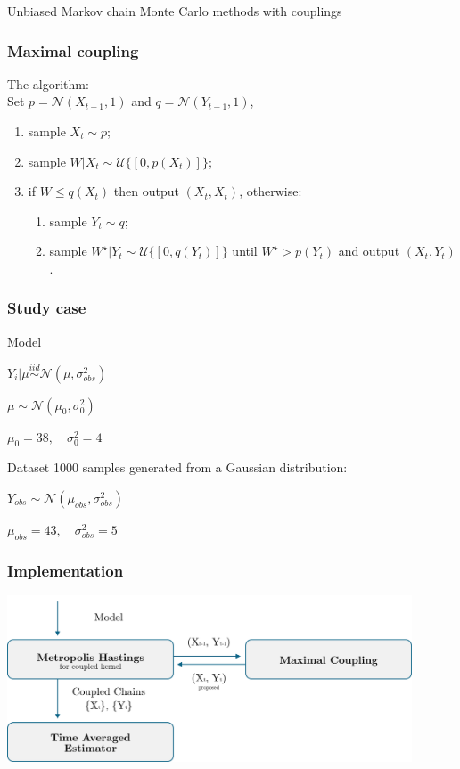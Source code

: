 \documentclass{beamer}
\begin{document}
\begin{section}{Unbiased Markov chain Monte Carlo methods with couplings}
	\begin{frame}
		\frametitle{Maximal coupling}
		The algorithm:\\
		
		Set $p = \mathcal{N}(X_{t-1},1)$ and $q = \mathcal{N}(Y_{t-1},1)$,
		\begin{enumerate}
			\item sample $X_t \sim p$;
			\item sample $W|X_t \sim \mathcal{U}\{[0,p(X_t)]\}$;
			\item if $W\leq q(X_t)$ then output $(X_t,X_t)$, otherwise:
			\begin{enumerate}
				\item sample $Y_t \sim q$;
				\item sample $W^\star | Y_t \sim \mathcal{U}\{[0, q(Y_t)]\}$ 
				until $W^\star > p(Y_t)$ and output $(X_t,Y_t)$.
			\end{enumerate}
		\end{enumerate}
	\end{frame}

	\begin{frame}
		\frametitle{Study case}
		
		\begin{block}{Model}
			\begin{center}
				$ Y_i | \mu \overset{iid}{\sim} \mathcal{N}(\mu, \sigma_{obs} ^2) $\\
				
				\vspace{0.3cm}
				
				$ \mu  \sim \mathcal{N}(\mu_0, \sigma_0^2)$
				
				$\mu_0 = 38, \quad \sigma^2_0 = 4$
			\end{center}
		\end{block}
		
		\begin{block}{Dataset}
			1000 samples generated from a Gaussian distribution:
			\begin{center}
				$
				Y_{obs} \sim \mathcal{N}(\mu_{obs}, \sigma_{obs} ^2)
				$
				
				$
				\mu_{obs} = 43, \quad
				\sigma_{obs} ^2 = 5
				$
			\end{center}
		\end{block}
	\end{frame}

	\begin{frame}
		\frametitle{Implementation}
		\begin{center}
			\includegraphics[width=0.9\textwidth]{img/Bayes1}
		\end{center}
	\end{frame}


\end{section}
\end{document}
